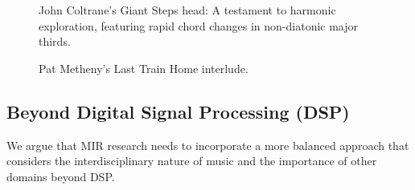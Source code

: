 \begin{figure}
    \centering
    \caption[Giant Steps]{\small{John Coltrane's Giant Steps head: A testament to harmonic exploration, featuring rapid chord changes in non-diatonic major thirds.}}
    \label{fig:giant_steps}
\end{figure}

\begin{figure}
    \centering
    \caption[Last Train Home]{\small{Pat Metheny's Last Train Home interlude.}}
    \label{fig:last_train}
\end{figure}


\subsection{Beyond Digital Signal Processing (DSP)}

We argue that MIR research needs to incorporate a more balanced approach that considers the interdisciplinary nature of music and the importance of other domains beyond DSP.